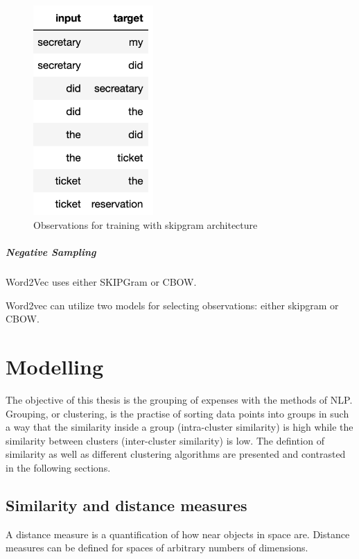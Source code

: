 		\begin{figure}[ht]
			\centering
			\includegraphics[height=8cm]{Bilder/word2vec/skipgram.png}
			\caption{Observations for training with skipgram architecture}
			\label{fig:cbow-architecture}
		\end{figure}
		
		
		\subparagraph{Negative Sampling}
		
		
		Word2Vec uses either SKIPGram or CBOW.
		
		Word2vec can utilize two models for selecting observations: either skipgram or \ac{CBOW}. 
		
	
		
\section{Modelling}
	The objective of this thesis is the grouping of expenses with the methods of \ac{NLP}. Grouping, or clustering, is the practise of sorting data points into groups in such a way that the similarity inside a group (intra-cluster similarity) is high while the similarity between clusters (inter-cluster similarity) is low. The defintion of similarity as well as different clustering algorithms are presented and contrasted in the following sections.
	
	\subsection{Similarity and distance measures}
	A distance measure is a quantification of how near objects in space are. Distance measures can be defined for spaces of arbitrary numbers of dimensions. 
	
	
	
